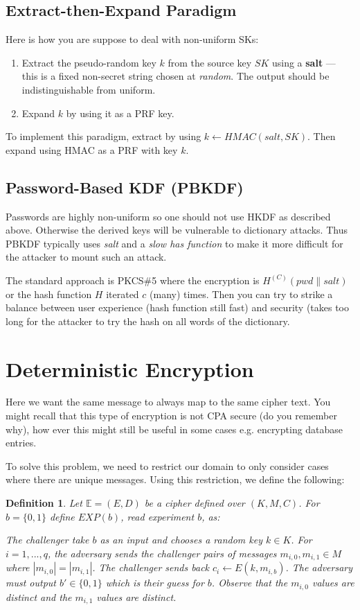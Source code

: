 \documentclass[twoside]{article}
\newtheorem{definition}[theorem]{Definition}
\newcommand\E{\mathbb{E}}
\def\E{\mathbb{E}}
\begin{document}
\subsection{Extract-then-Expand Paradigm}
Here is how you are suppose to deal with non-uniform SKs:
\begin{enumerate}
\item Extract the pseudo-random key $k$ from the source key $SK$ using a \textbf{salt} --- this is a fixed non-secret string chosen at \emph{random}. The output should be indistinguishable from uniform.
\item Expand $k$ by using it as a PRF key.
\end{enumerate}

To implement this paradigm, extract by using $k \leftarrow HMAC( salt, SK )$. Then expand using HMAC as a PRF with key $k$.

\subsection{Password-Based KDF (PBKDF)}

Passwords are highly non-uniform so one should not use HKDF as described above. Otherwise the derived keys will be vulnerable to dictionary attacks. Thus PBKDF typically uses \emph{salt} and a \emph{slow has function} to make it more difficult for the attacker to mount such an attack.

The standard approach is PKCS$\#$5 where the encryption is $H^{(C)}(pwd \parallel salt)$ or the hash function $H$ iterated $c$ (many) times. Then you can try to strike a balance between user experience (hash function still fast) and security (takes too long for the attacker to try the hash on all words of the dictionary. 

\section{Deterministic Encryption}

Here we want the same message to always map to the same cipher text. You might recall that this type of encryption is not CPA secure (do you remember why), how ever this might still be useful in some cases e.g. encrypting database entries.

To solve this problem, we need to restrict our domain to only consider cases where there are unique messages. Using this restriction, we define the following:
\begin{definition}
Let $\E = (E, D)$ be a cipher defined over $(K, M, C)$. For $b = \{0, 1\}$ define $EXP(b)$, read experiment $b$, as:

The challenger take $b$ as an input and chooses a random key $k \in K$. For $i = 1, ..., q$, the adversary sends the challenger pairs of messages $m_{i, 0}, m_{i, 1} \in M$ where $|m_{i,0}| = |m_{i,1}|$. The challenger sends back $c_i 
\leftarrow E(k, m_{i, b})$. The adversary must output $b' \in \{0,1\}$ which is their guess for $b$. Observe that the $m_{i,0}$ values are distinct and the $m_{i, 1}$ values are distinct.
\end{definition}
\end{document}
